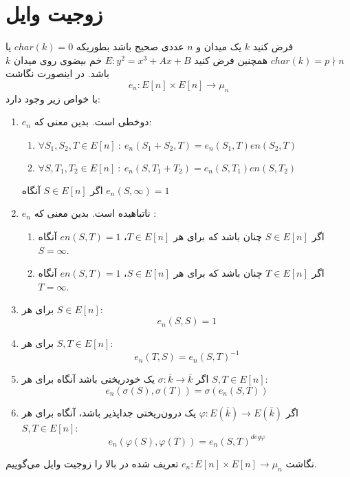 \section{زوجیت وایل}
فرض کنید 
$k$
یک میدان و 
$n$
عددی صحیح باشد بطوریکه 
$char(k)=0$
یا
$char(k)=p\nmid n$
همچنین فرض کنید
$E:y^2=x^3+Ax+B$
خم بیضوی روی میدان
$k$
باشد. در اینصورت نگاشت
$$ e_n : E[n] \times E[n] \longrightarrow \mu_n $$
با خواص زیر وجود دارد:
\begin{enumerate}
\item{
$e_n$
دوخطی است. بدین معنی که:
\begin{enumerate}
\item{
$\forall S_1,S_2,T \in E[n] ~:~ e_n(S_1+S_2,T)=e_n(S_1,T)en(S_2,T)  $
}

\item{
$\forall S,T_1,T_2 \in E[n] ~:~ e_n(S,T_1+T_2)=e_n(S,T_1)en(S,T_2)  $
}
\end{enumerate}

\lemma
اگر
$S \in E[n]$
آنگاه
$e_n(S,\infty)=1$
}
\item{
$e_n$
ناتباهیده است. بدین معنی که :
\begin{enumerate}
\item{
اگر
$S \in E[n]$
چنان باشد که برای هر
$T \in E[n]$،
$en(S,T)=1 $
آنگاه
$ S=\infty$.
}
\item{

اگر
$T \in E[n]$
چنان باشد که برای هر
$S \in E[n]$،
$en(S,T)=1 $
آنگاه
$ T=\infty$.
}
\end{enumerate}
}

\item{
برای هر
$S \in E[n]$:
$$ e_n(S,S)=1 $$
}

\item{
برای هر
$S,T \in E[n]$:
$$ e_n(T,S)=e_n(S,T)^{-1} $$
}

\item{
اگر
$\sigma : \bar{k} \rightarrow \bar{k}$
یک خودریختی باشد آنگاه برای هر
$S,T \in E[n]$:
$$ e_n(\sigma(S), \sigma(T)) = \sigma(e_n(S,T)) $$
}

\item{
اگر
$\varphi : E(\bar{k}) \rightarrow E(\bar{k})$
یک درون‌ریختی جداپذیر باشد، آنگاه برای هر
$S,T \in E[n]$:
$$ e_n(\varphi(S),\varphi(T)) = e_n(S,T)^{deg \varphi}$$
}
\end{enumerate}
نگاشت
$ e_n : E[n] \times E[n] \longrightarrow \mu_n $
تعریف شده در بالا را زوجیت وایل می‌گوییم.
\pagebreak
